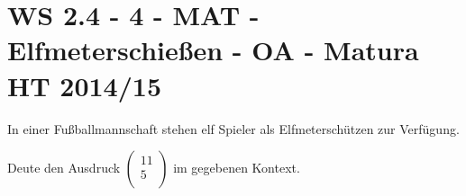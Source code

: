 \section{WS 2.4 - 4 - MAT - Elfmeterschießen - OA - Matura HT 2014/15}

\begin{beispiel}[WS 2.4]{1} %
In einer Fußballmannschaft stehen elf Spieler als Elfmeterschützen zur Verfügung.

Deute den Ausdruck $\begin{pmatrix}
	11 \\ 5 \\
\end{pmatrix}$ im gegebenen Kontext. 

\end{beispiel}